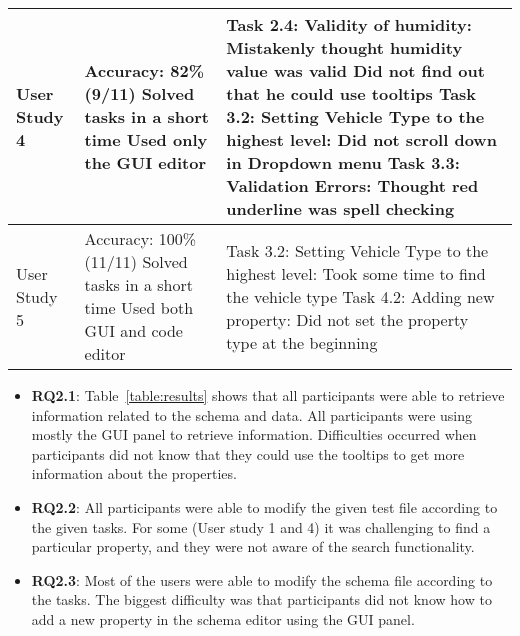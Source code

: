 \begin{table*}[!htbp]
\begin{tabular}{lp{4.5cm}p{6cm}}
        User Study 4 &
        Accuracy: 82\%(9/11)\newline
        Solved tasks in a short time\newline
        Used only the GUI editor

        &

        Task 2.4: Validity of humidity:\newline
        Mistakenly thought humidity value was valid\newline
        Did not find out that he could use tooltips\newline
        Task 3.2: Setting Vehicle Type to the highest level: \newline
        Did not scroll down in Dropdown menu\newline
        Task 3.3: Validation Errors:\newline
        Thought red underline was spell checking \\ \midrule

        User Study 5 &
        Accuracy: 100\%(11/11)\newline
        Solved tasks in a short time\newline
        Used both GUI and code editor

        &

        Task 3.2: Setting Vehicle Type to the highest level: \newline
        Took some time to find the vehicle type \newline
        Task 4.2: Adding new property:\newline
        Did not set the property type at the beginning \\ \bottomrule
    \end{tabular}
\end{table*}
\begin{itemize}
    \item \textbf{RQ2.1}: Table~\ref{table:results} shows that all
    participants were able to retrieve information related to the schema and data.
    All participants were using mostly the GUI panel to retrieve information.
    Difficulties occurred when participants did not know that they could use the tooltips to get more information about the properties.
    \item \textbf{RQ2.2}: All participants were able to modify the given test file according to the given tasks.
    For some (User study 1 and 4) it was challenging to find a particular property, and they were not aware of the search functionality.
    \item \textbf{RQ2.3}: Most of the users were able to modify the schema file according to the tasks.
    The biggest difficulty was that participants did not know how to add a new property in the schema editor using the GUI panel.
\end{itemize}

